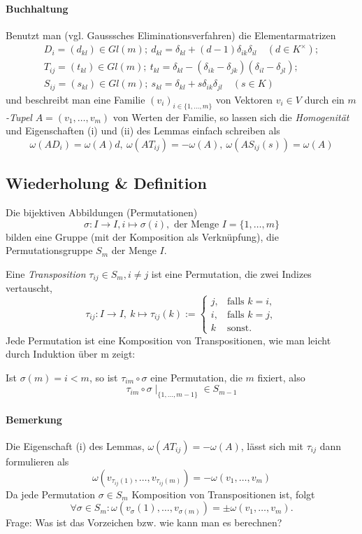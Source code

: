 \paragraph{Buchhaltung}
	Benutzt man (vgl. Gausssches Eliminationsverfahren) die Elementarmatrizen
	\begin{gather*}
		D_i = (d_{kl}) \in Gl(m);\ d_{kl} = \delta_{kl}+(d-1)\delta_{ik}\delta_{il}\quad (d\in K^\times);\\
		T_{ij} = (t_{kl}) \in Gl(m);\ t_{kl} = \delta_{kl}-(\delta_{ik}-\delta_{jk})(\delta_{il}-\delta_{jl});\\
		S_{ij} = (s_{kl})\in Gl(m);\ s_{kl}=\delta_{kl}+s\delta_{ik}\delta_{jl}\quad (s\in K)
	\end{gather*}
	und beschreibt man eine Familie $ (v_i)_{i\in \{1,\dots,m\}} $ von Vektoren $ v_i\in V $ durch ein \emph{$ m $-Tupel} $ A=(v_1,\dots,v_m) $ von Werten der Familie, so lassen sich die \emph{Homogenität} und Eigenschaften (i) und (ii) des Lemmas einfach schreiben als
		\[ \omega(AD_i) = \omega(A)d,\ \omega(AT_{ij}) = -\omega(A),\ \omega(AS_{ij}(s)) = \omega(A) \]
\subsection{Wiederholung \& Definition}
	Die bijektiven Abbildungen (Permutationen)
		\[ \sigma: I\to I, i\mapsto \sigma(i),\text{ der Menge }I = \{1,\dots,m\} \]
	bilden eine Gruppe (mit der Komposition als Verknüpfung), die Permutationsgruppe $ S_m $ der Menge $ I $.
	\begin{Definition}[Transposition]
	Eine \emph{Transposition} $ \tau_{ij} \in S_m, i\neq j $ ist eine Permutation, die zwei Indizes vertauscht,
		\[ \tau_{ij}:I\to I,\ k\mapsto \tau_{ij}(k):=
		\begin{cases}
			j, &\text{falls } k=i,\\
			i, &\text{falls } k=j,\\
			k & \text{sonst}.
		\end{cases} \]
	Jede Permutation ist eine Komposition von Transpositionen, wie man leicht durch Induktion über m zeigt:
	
	Ist $ \sigma(m) = i<m$, so ist $ \tau_{im}\circ \sigma $ eine Permutation, die $ m $ fixiert, also
		\[ \tau_{im}\circ\sigma\mid_{\{1,\dots,m-1\}}\in S_{m-1} \]
	\end{Definition}
\paragraph{Bemerkung}
	Die Eigenschaft (i) des Lemmas, $ \omega(AT_{ij})=-\omega(A) $, lässt sich mit $ \tau_{ij} $ dann formulieren als
		\[ \omega(v_{\tau_{ij}(1)}, \dots, v_{\tau_{ij}(m)}) = - \omega(v_1,\dots,v_m) \]
	Da jede Permutation $ \sigma\in S_m $ Komposition von Transpositionen ist, folgt
		\[ \forall \sigma\in S_m: \omega(v_{\sigma}(1),\dots,v_{\sigma(m)})=\pm \omega(v_1,\dots,v_{m}). \]
	Frage: Was ist das Vorzeichen bzw. wie kann man es berechnen?

